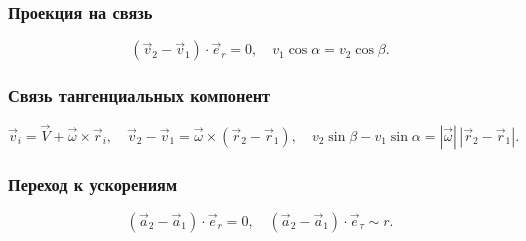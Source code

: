 \documentclass[12pt, a4paper]{article}
\begin{document}
\subsubsection*{Проекция на связь}

\[
(\vec v_2 - \vec v_1)\cdot\vec e_r = 0,
\quad
v_1\cos\alpha = v_2\cos\beta.
\]

\subsubsection*{Связь тангенциальных компонент}

\[
\vec v_i = \vec V + \vec\omega \times \vec r_i,
\quad
\vec v_2 - \vec v_1 = \vec\omega \times (\vec r_2 - \vec r_1),
\quad
v_2\sin\beta - v_1\sin\alpha = |\vec\omega|\,|\vec r_2 - \vec r_1|.
\]

\subsubsection*{Переход к ускорениям}

\[
(\vec a_2 - \vec a_1)\cdot\vec e_r = 0,
\quad
(\vec a_2 - \vec a_1)\cdot\vec e_\tau \sim r.
\]
\end{document}
